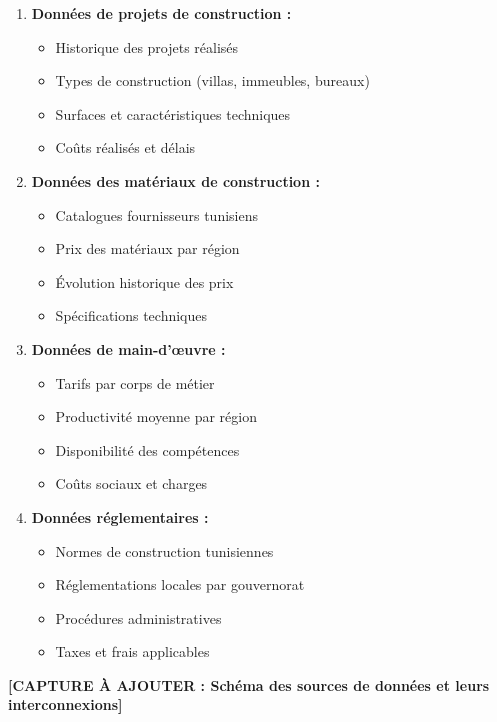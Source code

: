 \begin{enumerate}
    \item \textbf{Données de projets de construction :}
    \begin{itemize}
        \item Historique des projets réalisés
        \item Types de construction (villas, immeubles, bureaux)
        \item Surfaces et caractéristiques techniques
        \item Coûts réalisés et délais
    \end{itemize}
    
    \item \textbf{Données des matériaux de construction :}
    \begin{itemize}
        \item Catalogues fournisseurs tunisiens
        \item Prix des matériaux par région
        \item Évolution historique des prix
        \item Spécifications techniques
    \end{itemize}
    
    \item \textbf{Données de main-d'œuvre :}
    \begin{itemize}
        \item Tarifs par corps de métier
        \item Productivité moyenne par région
        \item Disponibilité des compétences
        \item Coûts sociaux et charges
    \end{itemize}
    
    \item \textbf{Données réglementaires :}
    \begin{itemize}
        \item Normes de construction tunisiennes
        \item Réglementations locales par gouvernorat
        \item Procédures administratives
        \item Taxes et frais applicables
    \end{itemize}
\end{enumerate}

\textbf{[CAPTURE À AJOUTER : Schéma des sources de données et leurs interconnexions]}

